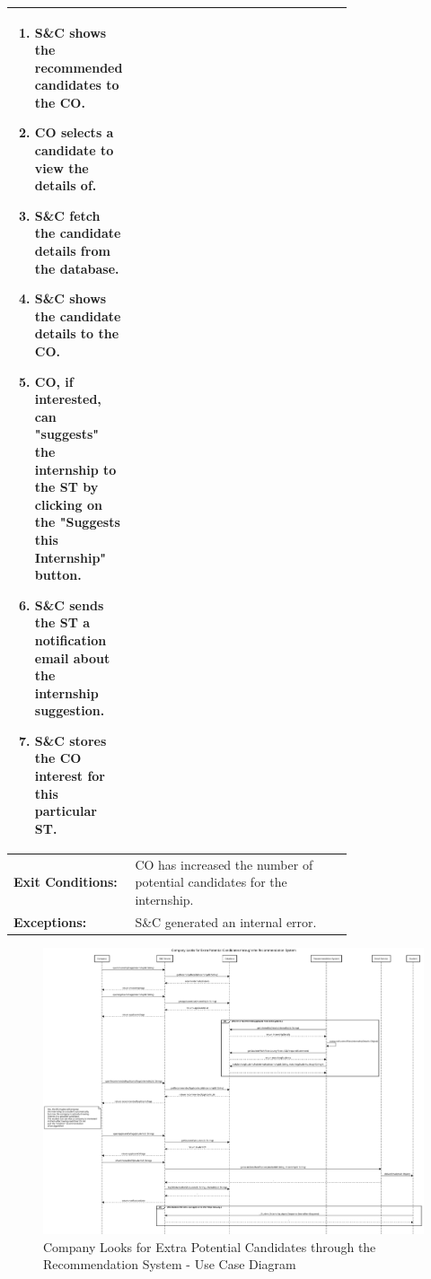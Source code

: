 \begin{center}
\begin{longtable}{|l|p{0.75\linewidth}|}
\begin{enumerate}
\begin{enumerate}
                  \end{enumerate}
                                         \item S\&C shows the recommended candidates to the CO.
                                         \item CO selects a candidate to view the details of.
                                         \item S\&C fetch the candidate details from the database.
                                         \item S\&C shows the candidate details to the CO.
                                         \item CO, if interested, can "suggests" the internship to the ST by clicking on the "Suggests this Internship" button.
                                         \item S\&C sends the ST a notification email about the internship suggestion.
                                         \item S\&C stores the CO interest for this particular ST.
                                     \end{enumerate} \\
        \hline
        \textbf{Exit Conditions:}  & CO has increased the number of potential candidates for the internship.                                               \\
        \hline
        \textbf{Exceptions:}       & S\&C generated an internal error.                                                                                     \\
        \hline
    \end{longtable}
\end{center}

\begin{figure}[H]
    \centering
    \includegraphics[width=1.0\textwidth]{Images/UC_10.pdf}
    \caption{Company Looks for Extra Potential Candidates through the Recommendation System - Use Case Diagram}
    \label{fig:use-case-diagram-10}
\end{figure}

